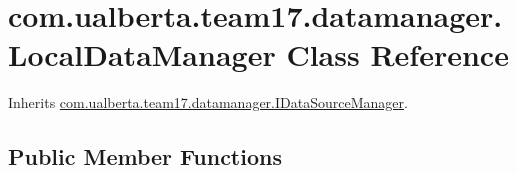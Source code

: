 \hypertarget{classcom_1_1ualberta_1_1team17_1_1datamanager_1_1_local_data_manager}{\section{com.\+ualberta.\+team17.\+datamanager.\+Local\+Data\+Manager Class Reference}
\label{classcom_1_1ualberta_1_1team17_1_1datamanager_1_1_local_data_manager}
}


Inherits \hyperlink{interfacecom_1_1ualberta_1_1team17_1_1datamanager_1_1_i_data_source_manager}{com.\+ualberta.\+team17.\+datamanager.\+I\+Data\+Source\+Manager}.

\subsection*{Public Member Functions}
